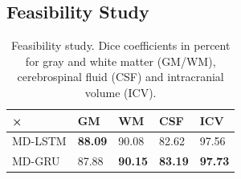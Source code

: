\documentclass[runningheads,a4paper]{llncs}
\begin{document}
\subsection{Feasibility Study}
\label{feasibilitystudylabel}
\begin{table}
\caption{Feasibility study. Dice coefficients in percent for gray and white matter (GM/WM), cerebrospinal fluid (CSF) and intracranial volume (ICV).}%
\begin{center}
\begin{tabular}{lllll}\toprule
× & GM & WM & CSF & ICV\\ \midrule
MD-LSTM  & \textbf{88.09}  & 90.08 & 82.62  & 97.56 \\ 
MD-GRU & 87.88 & \textbf{90.15 } & \textbf{83.19} & \textbf{97.73 }\\ \bottomrule
\end{tabular}
\label{feasibilityquantitative}
\end{center}
\end{table}
\end{document}
